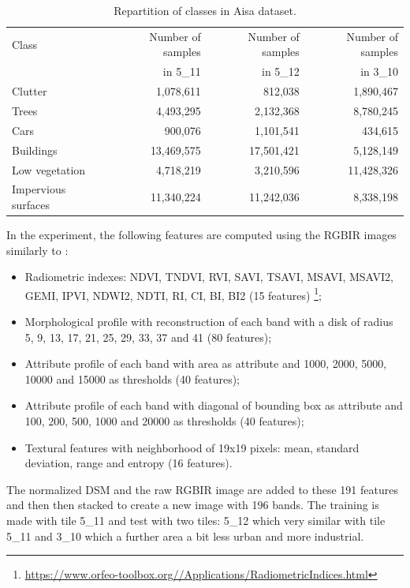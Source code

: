 \documentclass[journal,peerreview,onecolumn]{IEEEtran}
\begin{document}
    \begin{table}[!t]
        \centering
        \caption{Repartition of classes in Aisa dataset.\label{tab:potsdam}}
        \begin{tabular}[b]{lrrr}\hline
          Class & Number of samples & Number of samples & Number of samples \\
                & in 5\_11          & in 5\_12          & in 3\_10 \\
          \hline
          Clutter             & 1,078,611  & 812,038    & 1,890,467 \\
          Trees               & 4,493,295  & 2,132,368  & 8,780,245 \\
          Cars                & 900,076    & 1,101,541  & 434,615 \\
          Buildings           & 13,469,575 & 17,501,421 & 5,128,149 \\
          Low vegetation      & 4,718,219  & 3,210,596  & 11,428,326 \\
          Impervious surfaces & 11,340,224 & 11,242,036 & 8,338,198 \\
          \hline
        \end{tabular}
    \end{table}

    In the experiment, the following features are computed using the RGBIR images similarly to \cite{tuia2015multiclass}:
    \begin{itemize}
        \item Radiometric indexes: NDVI, TNDVI, RVI, SAVI, TSAVI, MSAVI, MSAVI2, GEMI, IPVI, NDWI2, NDTI, RI, CI, BI, BI2 (15 features) \footnote{\url{https://www.orfeo-toolbox.org//Applications/RadiometricIndices.html}};
        \item Morphological profile with reconstruction of each band with a disk of radius 5, 9, 13, 17, 21, 25, 29, 33, 37 and 41 (80 features);
        \item Attribute profile of each band with area as attribute and 1000, 2000, 5000, 10000 and 15000 as thresholds (40 features);
        \item Attribute profile of each band with diagonal of bounding box as attribute and 100, 200, 500, 1000 and 20000 as thresholds (40 features);
        \item Textural features with neighborhood of 19x19 pixels: mean, standard deviation, range and entropy (16 features).
    \end{itemize}
    The normalized DSM and the raw RGBIR image are added to these 191 features and then then stacked to create a new image with 196 bands. The training is made with tile 5\_11 and test with two tiles: 5\_12 which very similar with tile 5\_11 and 3\_10 which a further area a bit less urban and more industrial.
\end{document}
